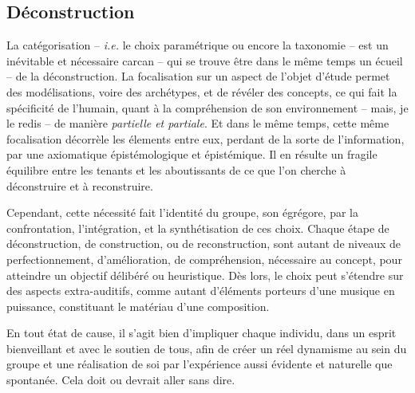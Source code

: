 \documentclass{article}
\begin{document}

\subsection{Déconstruction}

La catégorisation -- \textit{i.e.} le choix paramétrique ou encore la taxonomie -- est un inévitable et nécessaire carcan -- qui se trouve être dans le même temps un écueil -- de la déconstruction. La focalisation sur un aspect de l'objet d'étude permet des modélisations, voire des archétypes, et de révéler des concepts, ce qui fait la spécificité de l'humain, quant à la compréhension de son environnement -- mais, je le redis -- de manière \textit{partielle et partiale}. Et dans le même temps, cette même focalisation décorrèle les élements entre eux, perdant de la sorte de l'information, par  une axiomatique épistémologique et épistémique. Il en résulte un fragile équilibre entre les tenants et les aboutissants de ce que l'on cherche à déconstruire et à reconstruire. 

Cependant, cette nécessité fait l'identité du groupe, son égrégore, par la confrontation, l'intégration, et la synthétisation de ces choix.  Chaque étape de déconstruction, de construction, ou de reconstruction, sont autant de niveaux de %
perfectionnement, d'amélioration, de compréhension, nécessaire au concept, pour atteindre un objectif délibéré ou heuristique. 
Dès lors, le choix peut s'étendre sur des aspects extra-auditifs, comme autant d'éléments porteurs d'une musique en puissance, constituant le matériau d'une composition.

En tout état de cause, il s'agit bien d'impliquer chaque individu, dans un esprit bienveillant et avec le soutien de tous, afin de créer un réel dynamisme au sein du groupe et
une réalisation de soi par l’expérience aussi évidente et naturelle que spontanée. Cela doit ou devrait aller sans dire.


\end{document}
